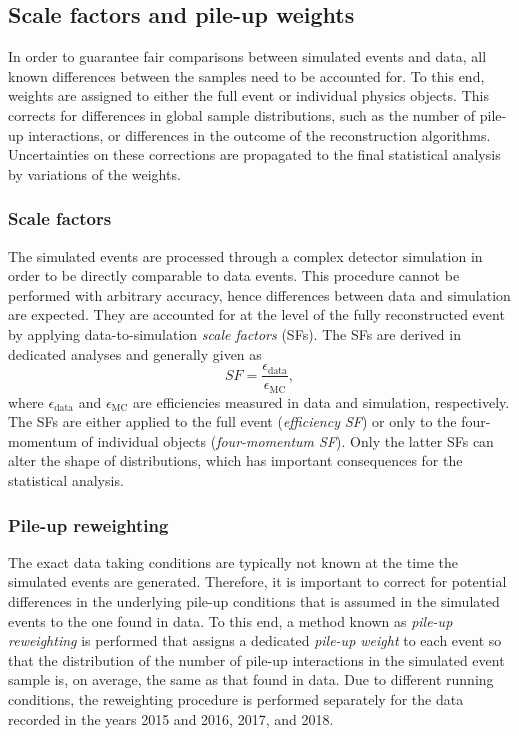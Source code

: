 \subsection{Scale factors and pile-up weights}
In order to guarantee fair comparisons between simulated events and data, all known differences between the samples need to be accounted for.
To this end, weights are assigned to either the full event or individual physics objects. This corrects for differences in global sample distributions, such as the number of pile-up interactions, or differences in the outcome of the reconstruction algorithms.
Uncertainties on these corrections are propagated to the final statistical analysis by variations of the weights.

\subsubsection{Scale factors}
The simulated events are processed through a complex detector simulation in order to be directly comparable to data events. This procedure cannot be performed with arbitrary accuracy, hence differences between data and simulation are expected.
They are accounted for at the level of the fully reconstructed event by applying data-to-simulation \emph{scale factors} (SFs). The SFs are derived in dedicated analyses and generally given as
\begin{equation}
    SF = \frac{\epsilon_\text{data}}{\epsilon_{\text{MC}}},
\end{equation}
where $\epsilon_\text{data}$ and $\epsilon_\text{MC}$ are efficiencies measured in data and simulation, respectively.
The SFs are either applied to the full event (\emph{efficiency SF}) or only to the four-momentum of individual objects (\emph{four-momentum SF}). Only the latter SFs can alter the shape of distributions, which has important consequences for the statistical analysis.

\subsubsection{Pile-up reweighting}
The exact data taking conditions are typically not known at the time the simulated events are generated.
Therefore, it is important to correct for potential differences in the underlying pile-up conditions that is assumed in the simulated events to the one found in data.
To this end, a method known as \emph{pile-up reweighting} is performed that assigns a dedicated \emph{pile-up weight} to each event so that the distribution of the number of pile-up interactions in the simulated event sample is, on average, the same as that found in data. Due to different running conditions, the reweighting procedure is performed separately for the data recorded in the years 2015 and 2016, 2017, and 2018.


